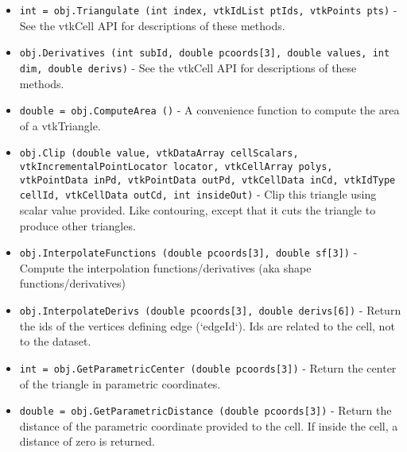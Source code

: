 \begin{itemize}
\item  \verb|int = obj.Triangulate (int index, vtkIdList ptIds, vtkPoints pts)| -  See the vtkCell API for descriptions of these methods.

\item  \verb|obj.Derivatives (int subId, double pcoords[3], double values, int dim, double derivs)| -  See the vtkCell API for descriptions of these methods.

\item  \verb|double = obj.ComputeArea ()| -  A convenience function to compute the area of a vtkTriangle.

\item  \verb|obj.Clip (double value, vtkDataArray cellScalars, vtkIncrementalPointLocator locator, vtkCellArray polys, vtkPointData inPd, vtkPointData outPd, vtkCellData inCd, vtkIdType cellId, vtkCellData outCd, int insideOut)| -  Clip this triangle using scalar value provided. Like contouring, except
 that it cuts the triangle to produce other triangles.

\item  \verb|obj.InterpolateFunctions (double pcoords[3], double sf[3])| -  Compute the interpolation functions/derivatives
 (aka shape functions/derivatives)

\item  \verb|obj.InterpolateDerivs (double pcoords[3], double derivs[6])| -  Return the ids of the vertices defining edge (`edgeId`).
 Ids are related to the cell, not to the dataset.

\item  \verb|int = obj.GetParametricCenter (double pcoords[3])| -  Return the center of the triangle in parametric coordinates.

\item  \verb|double = obj.GetParametricDistance (double pcoords[3])| -  Return the distance of the parametric coordinate provided to the
 cell. If inside the cell, a distance of zero is returned.

\end{itemize}
